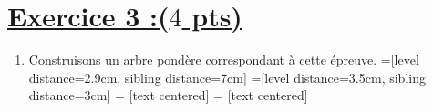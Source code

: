 \documentclass[12pt,a4paper]{article}
\begin{document}
\section*{\underline{Exercice 3 :($4$ pts)} }
\begin{enumerate}
    \item Construisons un arbre pondère correspondant à cette épreuve.
=[level distance=2.9cm, sibling distance=7cm] %
=[level distance=3.5cm, sibling distance=3cm] %
 = [text centered] %
 = [text centered] %

\begin{tikzpicture}[grow=right, sloped] %


\end{tikzpicture}
\end{enumerate}
\end{document}
